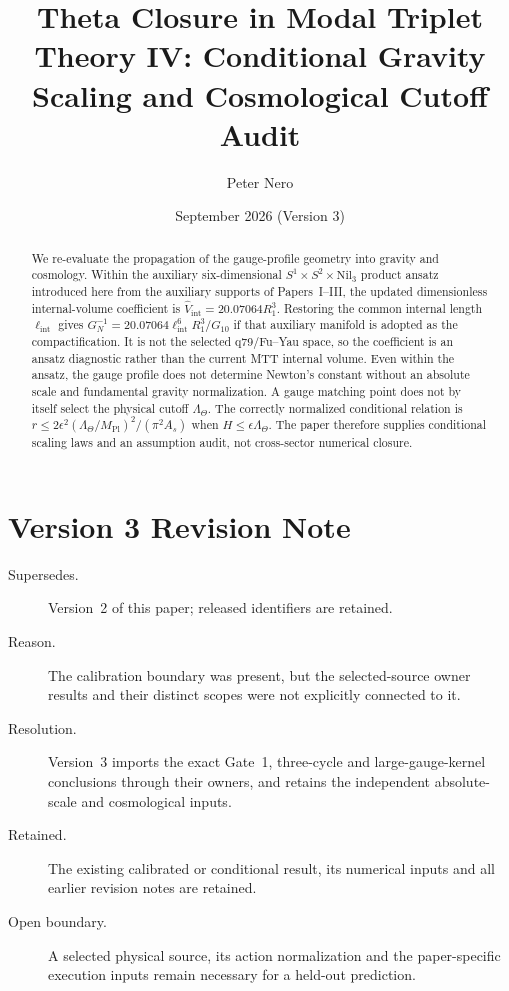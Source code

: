 \documentclass[11pt]{article}
\title{Theta Closure in Modal Triplet Theory IV:
Conditional Gravity Scaling and Cosmological Cutoff Audit}
\author{Peter Nero}
\date{September 2026 (Version 3)}
\begin{document}
\maketitle

\begin{abstract}
We re-evaluate the propagation of the gauge-profile geometry into gravity and
cosmology. Within the auxiliary six-dimensional
$S^1\times S^2\times\mathrm{Nil}_3$ product ansatz introduced here from
the auxiliary supports of Papers~I--III, the
updated dimensionless internal-volume coefficient is
$\widehat V_{\mathrm{int}}=20.07064R_1^3$. Restoring the common internal length
$\ell_{\mathrm{int}}$ gives
$G_N^{-1}=20.07064\ell_{\mathrm{int}}^6R_1^3/G_{10}$ if that auxiliary
manifold is adopted as the compactification. It is not the selected q79/Fu--Yau
space, so the coefficient is an ansatz diagnostic rather than the current MTT
internal volume. Even within the ansatz, the gauge profile does not determine
Newton's constant without an absolute scale and fundamental gravity
normalization. A gauge matching point does not by itself select the physical
cutoff $\Lambda_\Theta$.
The correctly normalized conditional relation is
$r\leq 2\epsilon^2(\Lambda_\Theta/M_{\mathrm{Pl}})^2/(\pi^2A_s)$ when
$H\leq\epsilon\Lambda_\Theta$. The paper therefore supplies conditional
scaling laws and an assumption audit, not cross-sector numerical closure.
\end{abstract}

\section*{Version 3 Revision Note}
\label{sec:revision-v3}
\begin{description}
\item[Supersedes.] Version~2 of this paper; released identifiers are retained.
\item[Reason.] The calibration boundary was present, but the selected-source
owner results and their distinct scopes were not explicitly connected to it.
\item[Resolution.] Version~3 imports the exact Gate~1, three-cycle and
large-gauge-kernel conclusions through their owners, and retains the independent absolute-scale and cosmological inputs.
\item[Retained.] The existing calibrated or conditional result, its numerical
inputs and all earlier revision notes are retained.
\item[Open boundary.] A selected physical source, its action normalization and
the paper-specific execution inputs remain necessary for a held-out prediction.
\end{description}
\end{document}

